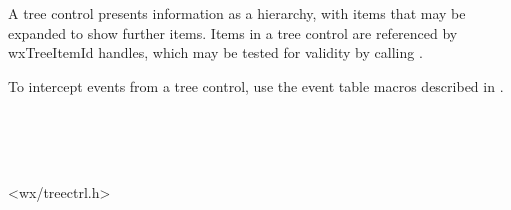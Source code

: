 
\section{}\label{wxtreectrl}

A tree control presents information as a hierarchy, with items that may be expanded
to show further items. Items in a tree control are referenced by wxTreeItemId handles,
which may be tested for validity by calling .

To intercept events from a tree control, use the event table macros described in .


\\
\\
\\


<wx/treectrl.h>


